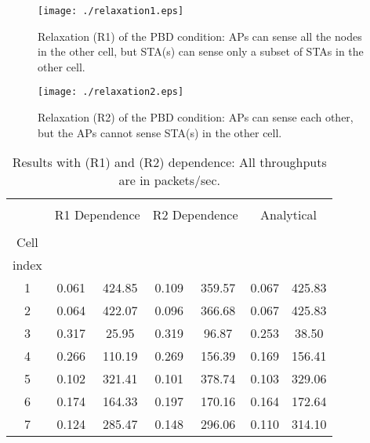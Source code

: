 \documentclass[10pt,a4paper,journal]{IEEEtran}
\theoremstyle{definition}
\theoremstyle{remark}
\theoremstyle{plain}
\begin{document}
\begin{figure}[tb]
\centering
\hspace{-4mm}
\begin{minipage}{4.5cm}
\begin{center}
\texttt{[image: ./relaxation1.eps]}
\caption{Relaxation (R1) of the PBD condition: APs can sense all the
  nodes in the other cell, but  STA(s) can sense only a
  subset of STAs in the other cell. \label{fig:relaxation1}}
\end{center}
\end{minipage}
\hspace{1mm}
\begin{minipage}{3.2cm}
\begin{center}
\texttt{[image: ./relaxation2.eps]}
\caption{Relaxation (R2) of the PBD condition: APs can sense each
  other, but the APs cannot sense  STA(s) in the other
  cell. \label{fig:relaxation2}}
\end{center}
\end{minipage}
\end{figure}


\begin{small}
\begin{table}[tb]
\begin{center}
\caption{\label{table:results-when-PBD-does-not-hold} Results with (R1) and (R2) dependence: All throughputs are in packets/sec.}
\begin{footnotesize}
\begin{tabular}{||c|c|c|c|c|c|c||}
\hline
& \multicolumn{2}{c|}{} & \multicolumn{2}{c|}{} & \multicolumn{2}{c||}{} \\
& \multicolumn{2}{c|}{R1 Dependence} & \multicolumn{2}{c|}{R2 Dependence} & \multicolumn{2}{c||}{Analytical} \\
\cline{2-7} & & & & & & \\
Cell &  &  &  &  &  &  \\
index & & & & & & \\
\hline
\hline
1 & 0.061 & 424.85 & 0.109 & 359.57 & 0.067 & 425.83 \\
\hline
2 & 0.064 & 422.07 & 0.096 & 366.68 & 0.067 & 425.83 \\
\hline
3 & 0.317 & 25.95 & 0.319 & 96.87 & 0.253 & 38.50 \\
\hline
4 & 0.266 & 110.19 & 0.269 & 156.39 & 0.169 & 156.41 \\
\hline
5 & 0.102 & 321.41 & 0.101 & 378.74 & 0.103 & 329.06 \\
\hline
6 & 0.174 & 164.33 & 0.197 & 170.16 & 0.164 & 172.64 \\
\hline
7 & 0.124 & 285.47 & 0.148 & 296.06 & 0.110 & 314.10 \\
\hline
\end{tabular}
\end{footnotesize}
\end{center}
\end{table}
\end{small}
\end{document}
